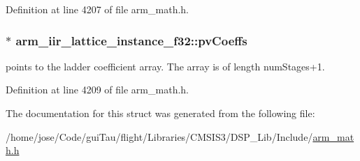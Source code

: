 Definition at line 4207 of file arm\-\_\-math.\-h.

\hypertarget{structarm__iir__lattice__instance__f32_afc7c8f577e6f27d097fe55f57e707f72}{
\subsubsection[{pv\-Coeffs}]{$\ast$ arm\-\_\-iir\-\_\-lattice\-\_\-instance\-\_\-f32\-::pv\-Coeffs}}\label{structarm__iir__lattice__instance__f32_afc7c8f577e6f27d097fe55f57e707f72}
points to the ladder coefficient array. The array is of length num\-Stages+1. 

Definition at line 4209 of file arm\-\_\-math.\-h.



The documentation for this struct was generated from the following file\-:\begin{DoxyCompactItemize}
\item 
/home/jose/\-Code/gui\-Tau/flight/\-Libraries/\-C\-M\-S\-I\-S3/\-D\-S\-P\-\_\-\-Lib/\-Include/\hyperlink{arm__math_8h}{arm\-\_\-math.\-h}\end{DoxyCompactItemize}
